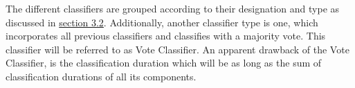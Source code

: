 		\par
		
		The different classifiers are grouped according to their designation and type as discussed in \hyperref[classifer_types]{section 3.2}. Additionally, another classifier type is one, which incorporates all previous classifiers and classifies with a majority vote. This classifier will be referred to as Vote Classifier. An apparent drawback of the Vote Classifier, is the classification duration which will be as long as the sum of classification durations of all its components.
		
		